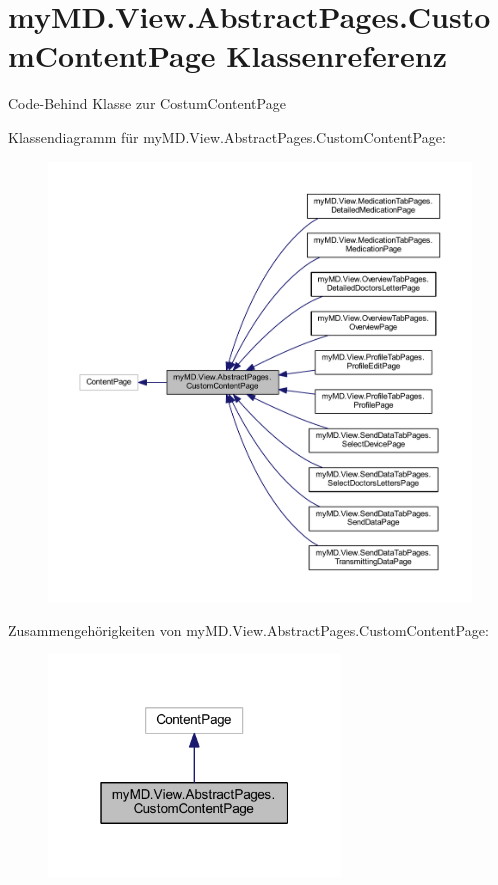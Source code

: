 \hypertarget{classmy_m_d_1_1_view_1_1_abstract_pages_1_1_custom_content_page}{}\section{my\+M\+D.\+View.\+Abstract\+Pages.\+Custom\+Content\+Page Klassenreferenz}
\label{classmy_m_d_1_1_view_1_1_abstract_pages_1_1_custom_content_page}


Code-\/\+Behind Klasse zur Costum\+Content\+Page  




Klassendiagramm für my\+M\+D.\+View.\+Abstract\+Pages.\+Custom\+Content\+Page\+:\nopagebreak
\begin{figure}[H]
\begin{center}
\leavevmode
\includegraphics[width=350pt]{classmy_m_d_1_1_view_1_1_abstract_pages_1_1_custom_content_page__inherit__graph}
\end{center}
\end{figure}


Zusammengehörigkeiten von my\+M\+D.\+View.\+Abstract\+Pages.\+Custom\+Content\+Page\+:\nopagebreak
\begin{figure}[H]
\begin{center}
\leavevmode
\includegraphics[width=220pt]{classmy_m_d_1_1_view_1_1_abstract_pages_1_1_custom_content_page__coll__graph}
\end{center}
\end{figure}
